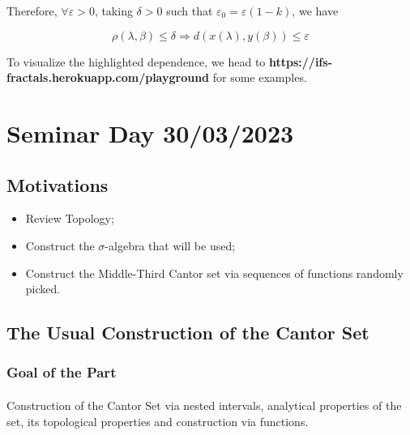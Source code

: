 \documentclass[a4paper]{article}
\theoremstyle{plain}
\theoremstyle{definition}
\begin{document}
Therefore, $\forall \varepsilon>0$, taking $\delta>0$ such that $\varepsilon_0  = \varepsilon(1-k)$, we have

$$\rho(\lambda,\beta) \le \delta \Rightarrow d(x(\lambda),y(\beta)) \le \varepsilon$$

\qedsymbol

To visualize the highlighted dependence, we head to \textbf{https://ifs-fractals.herokuapp.com/playground} for some examples.

\section{Seminar Day 30/03/2023} 
 \subsection{Motivations} 
 \begin{itemize} 
   \item Review Topology; 
   \item Construct the $\sigma$-algebra that will be used; 
   \item Construct the Middle-Third Cantor set via sequences of functions randomly picked. 
 \end{itemize} 
  
 \subsection{The Usual Construction of the Cantor Set} 
 \subsubsection{Goal of the Part} 
  \paragraph{} Construction of the Cantor Set via nested intervals, analytical properties of the set, its topological properties and construction 
 via functions. 
\end{document}

